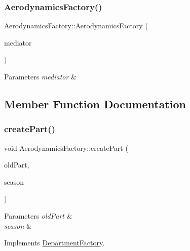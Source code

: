 \subsubsection{\texorpdfstring{Aerodynamics\+Factory()}{AerodynamicsFactory()}}
{\footnotesize\ttfamily Aerodynamics\+Factory\+::\+Aerodynamics\+Factory (\begin{DoxyParamCaption}\item[{\hyperlink{classDepartmentMediator}{Department\+Mediator} $\ast$}]{mediator }\end{DoxyParamCaption})}


\begin{DoxyParams}{Parameters}
{\em mediator} & \\
\hline
\end{DoxyParams}


\subsection{Member Function Documentation}
\mbox{\label{classAerodynamicsFactory_a2c6e6ce04d21da014e3c0c6affe423ae}} 
\subsubsection{\texorpdfstring{create\+Part()}{createPart()}}
{\footnotesize\ttfamily void Aerodynamics\+Factory\+::create\+Part (\begin{DoxyParamCaption}\item[{\hyperlink{classDepartmentOutput}{Department\+Output} $\ast$}]{old\+Part,  }\item[{string}]{season }\end{DoxyParamCaption})\hspace{0.3cm}{\ttfamily [virtual]}}


\begin{DoxyParams}{Parameters}
{\em old\+Part} & \\
\hline
{\em season} & \\
\hline
\end{DoxyParams}


Implements \hyperlink{classDepartmentFactory_a6080a560efb9fe0b9c870db5a7358886}{Department\+Factory}.

\mbox{\label{classAerodynamicsFactory_a687a3fcb4eeabf97d8c024cfb63406e5}} 
